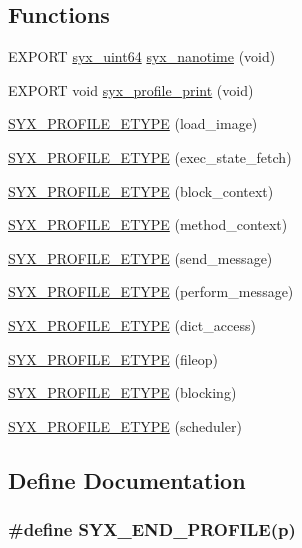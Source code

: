 \subsection*{Functions}
\begin{CompactItemize}
\item 
EXPORT \hyperlink{syx-types_8h_5a7750bec2122e7d3fccdffa19e87efe}{syx\_\-uint64} \hyperlink{syx-profile_8h_1053a009362cd6785e723dcfe951bd64}{syx\_\-nanotime} (void)
\item 
EXPORT void \hyperlink{syx-profile_8h_5a29c7703551e87902d111cd247fbc21}{syx\_\-profile\_\-print} (void)
\item 
\hyperlink{syx-profile_8h_eaa9e93f2dedca5e54f4a6c7709dbae6}{SYX\_\-PROFILE\_\-ETYPE} (load\_\-image)
\item 
\hyperlink{syx-profile_8h_6b3f3d4d962ca14be3bfcab87aab0a92}{SYX\_\-PROFILE\_\-ETYPE} (exec\_\-state\_\-fetch)
\item 
\hyperlink{syx-profile_8h_661fe978d1597a0610dfcc7cd71ecd36}{SYX\_\-PROFILE\_\-ETYPE} (block\_\-context)
\item 
\hyperlink{syx-profile_8h_ccb2beb06793eeb6847439b42652e555}{SYX\_\-PROFILE\_\-ETYPE} (method\_\-context)
\item 
\hyperlink{syx-profile_8h_51182369c8bf6944c7fef35474c476b9}{SYX\_\-PROFILE\_\-ETYPE} (send\_\-message)
\item 
\hyperlink{syx-profile_8h_ae1f40f75f9c87d40e1f64ff395febb0}{SYX\_\-PROFILE\_\-ETYPE} (perform\_\-message)
\item 
\hyperlink{syx-profile_8h_f8c3f5c3c9a5d981d510a828f29995c7}{SYX\_\-PROFILE\_\-ETYPE} (dict\_\-access)
\item 
\hyperlink{syx-profile_8h_c49b8442f54716f64e5371d82e5430a2}{SYX\_\-PROFILE\_\-ETYPE} (fileop)
\item 
\hyperlink{syx-profile_8h_96434be4e8746f3826e1d55bb9a1842f}{SYX\_\-PROFILE\_\-ETYPE} (blocking)
\item 
\hyperlink{syx-profile_8h_7181a4a8be876589ccf60b56f7ee792a}{SYX\_\-PROFILE\_\-ETYPE} (scheduler)
\end{CompactItemize}


\subsection{Define Documentation}
\hypertarget{syx-profile_8h_6c83a6245e6bb84f65dc1d0471656ccf}{
\subsubsection{\setlength{\rightskip}{0pt plus 5cm}\#define SYX\_\-END\_\-PROFILE(p)}}
\label{syx-profile_8h_6c83a6245e6bb84f65dc1d0471656ccf}




